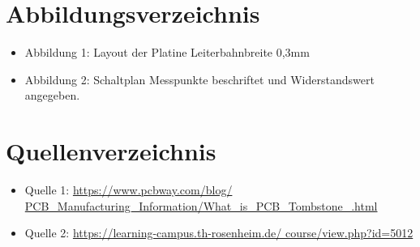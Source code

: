 \documentclass[a4paper,12pt]{article}
\begin{document}
\newpage


\newpage
\tableofcontents		%
\newpage


\newpage

\newpage

\newpage

\newpage


\newpage
\section*{Abbildungsverzeichnis}
\begin{itemize}
    \item Abbildung 1: Layout der Platine Leiterbahnbreite 0,3mm
    \item Abbildung 2: Schaltplan Messpunkte beschriftet und Widerstandswert angegeben.
    
\end{itemize}

\section*{Quellenverzeichnis}
\begin{itemize}
    \item Quelle 1: \url{https://www.pcbway.com/blog/
    PCB_Manufacturing_Information/What_is_PCB_Tombstone_.html}
    \item Quelle 2: \url{https://learning-campus.th-rosenheim.de/
    course/view.php?id=5012}
\end{itemize}
\end{document}
